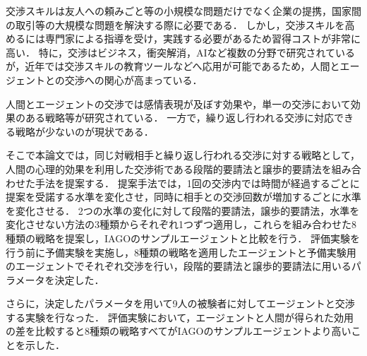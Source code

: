 
交渉スキルは友人への頼みごと等の小規模な問題だけでなく企業の提携，国家間の取引等の大規模な問題を解決する際に必要である．
しかし，交渉スキルを高めるには専門家による指導を受け，実践する必要があるため習得コストが非常に高い．
特に，交渉はビジネス，衝突解消，AIなど複数の分野で研究されているが，近年では交渉スキルの教育ツールなどへ応用が可能であるため，人間とエージェントとの交渉への関心が高まっている．

人間とエージェントの交渉では感情表現が及ぼす効果や，単一の交渉において効果のある戦略等が研究されている．
一方で，繰り返し行われる交渉に対応できる戦略が少ないのが現状である．

そこで本論文では，同じ対戦相手と繰り返し行われる交渉に対する戦略として，人間の心理的効果を利用した交渉術である段階的要請法と譲歩的要請法を組み合わせた手法を提案する．
提案手法では，1回の交渉内では時間が経過するごとに提案を受諾する水準を変化させ，同時に相手との交渉回数が増加するごとに水準を変化させる．
2つの水準の変化に対して段階的要請法，譲歩的要請法，水準を変化させない方法の3種類からそれぞれ1つずつ適用し，これらを組み合わせた8種類の戦略を提案し，IAGOのサンプルエージェントと比較を行う．
評価実験を行う前に予備実験を実施し，8種類の戦略を適用したエージェントと予備実験用のエージェントでそれぞれ交渉を行い，段階的要請法と譲歩的要請法に用いるパラメータを決定した．

さらに，決定したパラメータを用いて9人の被験者に対してエージェントと交渉する実験を行なった．
評価実験において，エージェントと人間が得られた効用の差を比較すると8種類の戦略すべてがIAGOのサンプルエージェントより高いことを示した．
